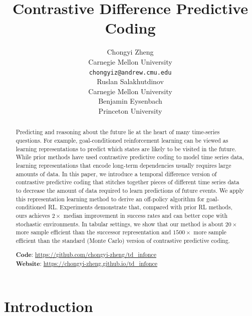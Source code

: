 \documentclass{article} %
\title{Contrastive Difference Predictive Coding}
\author{Chongyi Zheng \\
Carnegie Mellon University \\
\texttt{chongyiz@andrew.cmu.edu} \\
\And
Ruslan Salakhutdinov \\
Carnegie Mellon University \\
\And
Benjamin Eysenbach \\
Princeton University \\
}
\begin{document}
\maketitle

\begin{abstract}


Predicting and reasoning about the future lie at the heart of many time-series questions. For example, goal-conditioned reinforcement learning can be viewed as learning representations to predict which states are likely to be visited in the future. While prior methods have used contrastive predictive coding to model time series data, learning representations that encode long-term dependencies usually requires large amounts of data. In this paper, we introduce a temporal difference version of contrastive predictive coding that stitches together pieces of different time series data to decrease the amount of data required to learn predictions of future events. We apply this representation learning method to derive an off-policy algorithm for goal-conditioned RL. Experiments demonstrate that, compared with prior RL methods, ours achieves $2 \times$ median improvement in success rates and can better cope with stochastic environments. In tabular settings, we show that our method is about $20\times$ more sample efficient than the successor representation and $1500 \times$ more sample efficient than the standard (Monte Carlo) version of contrastive predictive coding.

\textbf{Code}: {\footnotesize\url{https://github.com/chongyi-zheng/td_infonce}}\\
\textbf{Website}: {\footnotesize\url{https://chongyi-zheng.github.io/td_infonce}}


\end{abstract}

\section{Introduction}
\label{sec:intro}
\end{document}
